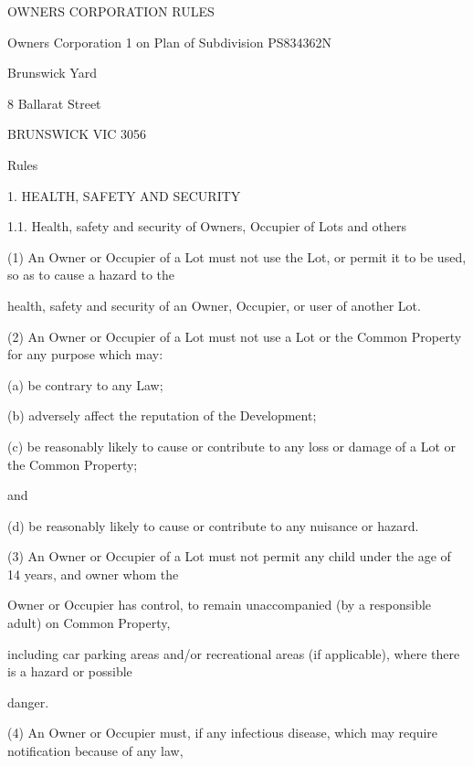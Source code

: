 \documentclass{article}
\begin{document}

{\fontsize{13.98}{1}OWNERS CORPORATION RULES }

{\fontsize{10.98}{1}Owners Corporation 1 on Plan of Subdivision PS834362N }

{\fontsize{10.98}{1}Brunswick Yard }

{\fontsize{10.98}{1}8 Ballarat Street }

{\fontsize{10.98}{1}BRUNSWICK VIC 3056 }

\newpage

{\fontsize{10.02}{1}Rules }

{\fontsize{9.99}{1}1. HEALTH, SAFETY AND SECURITY }

{\fontsize{9.99}{1}1.1. Health, safety and security of Owners, Occupier of Lots and others }

{\fontsize{9.962}{1}(1) An Owner or Occupier of a Lot must not use the Lot, or permit it to be used, so as to cause a hazard to the }

{\fontsize{10.02}{1}health, safety and security of an Owner, Occupier, or user of another Lot. }

{\fontsize{9.962}{1}(2) An Owner or Occupier of a Lot must not use a Lot or the Common Property for any purpose which may: }

{\fontsize{9.962}{1}(a) be contrary to any Law; }

{\fontsize{9.962}{1}(b) adversely affect the reputation of the Development;  }

{\fontsize{9.962}{1}(c) be reasonably likely to cause or contribute to any loss or damage of a Lot or the Common Property; }

{\fontsize{10.02}{1}and }

{\fontsize{9.962}{1}(d) be reasonably likely to cause or contribute to any nuisance or hazard. }

{\fontsize{9.962}{1}(3) An Owner or Occupier of a Lot must not permit any child under the age of 14 years, and owner whom the }

{\fontsize{10.02}{1}Owner or Occupier has control, to remain unaccompanied (by a responsible adult) on Common Property, }

{\fontsize{10.02}{1}including car parking areas and/or recreational areas (if applicable), where there is a hazard or possible }

{\fontsize{10.02}{1}danger. }

{\fontsize{9.962}{1}(4) An Owner or Occupier must, if any infectious disease, which may require notification because of any law, }
\end{document}
